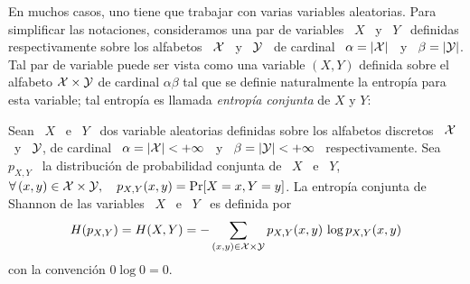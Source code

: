 En muchos  casos, uno tiene que  trabajar con varias  variables aleatorias. Para
simplificar las notaciones, consideramos una par de  variables \ $X$ \ y \ $Y$ \
definidas respectivamente sobre los alfabetos \ $\mathcal{X}$  \ y \ $\mathcal{Y}$ \ de cardinal \
$\alpha = |\mathcal{X}|$ \ y \ $\beta =  |\mathcal{Y}|$.  Tal par de variable puede ser vista como
una  variable $(X,Y)$  definida sobre  el alfabeto  $\mathcal{X} \times  \mathcal{Y}$  de cardinal
$\alpha \beta$ tal que se definie naturalmente la entrop\'ia para esta variable;
tal entrop\'ia es llamada {\it entrop\'ia conjunta} de $X$ y $Y$:
%
\begin{definicion}\label{def:SZ:EntropiaConjunta}
  Sean \ $X$ \  e \ $Y$ \ dos variable aleatorias  definidas sobre los alfabetos
  discretos \  $\mathcal{X}$ \ y \ $\mathcal{Y}$,  de cardinal \ $\alpha  = |\mathcal{X}| < +\infty$  \ y \
  $\beta  =  |\mathcal{Y}|   <  +\infty$  \  respectivamente.   Sea   \  $p_{X,Y}$  \  la
  distribuci\'on de probabilidad conjunta de \ $X$ \ e \ $Y$, \ \ie $ \forall \,
  (x,y)  \in \mathcal{X}  \times  \mathcal{Y}, \quad  p_{X,Y}(x,y)  = \Pr[X  =  x ,  Y  = y]$.  La
  entrop\'ia conjunta de Shannon de las variables  \ $X$ \ e \ $Y$ \ es definida
  por
  \[
  H(p_{X,Y}) =  H(X,Y) = -  \sum_{(x,y) \in \mathcal{X}  \times \mathcal{Y}} p_{X,Y}(x,y)  \, \log
  p_{X,Y}(x,y)
  \]
  con la convenci\'on $0 \log 0 = 0$.
\end{definicion}

